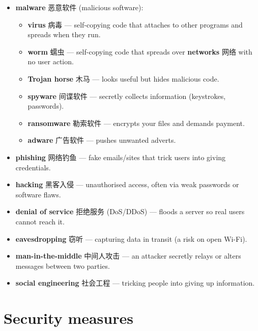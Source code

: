 \documentclass[11pt]{article}
\begin{document}
\begin{itemize}
\item \textbf{malware} 恶意软件 (malicious software):

\begin{itemize}
\item \textbf{virus} 病毒 — self-copying code that attaches to other programs and spreads when they run.

\item \textbf{worm} 蠕虫 — self-copying code that spreads over \textbf{networks} 网络 with no user action.

\item \textbf{Trojan horse} 木马 — looks useful but hides malicious code.

\item \textbf{spyware} 间谍软件 — secretly collects information (keystrokes, passwords).

\item \textbf{ransomware} 勒索软件 — encrypts your files and demands payment.

\item \textbf{adware} 广告软件 — pushes unwanted adverts.

\end{itemize}

\item \textbf{phishing} 网络钓鱼 — fake emails/sites that trick users into giving credentials.

\item \textbf{hacking} 黑客入侵 — unauthorised access, often via weak passwords or software flaws.

\item \textbf{denial of service} 拒绝服务 (DoS/DDoS) — floods a server so real users cannot reach it.

\item \textbf{eavesdropping} 窃听 — capturing data in transit (a risk on open Wi-Fi).

\item \textbf{man-in-the-middle} 中间人攻击 — an attacker secretly relays or alters messages between two parties.

\item \textbf{social engineering} 社会工程 — tricking people into giving up information.

\end{itemize}

\section*{Security measures}
\end{document}
